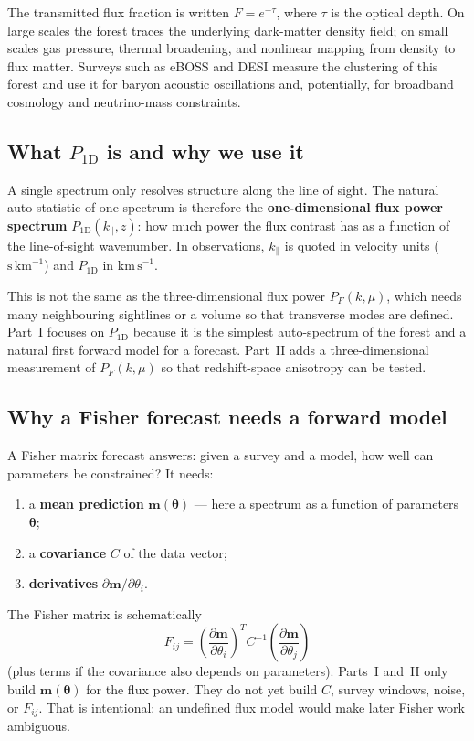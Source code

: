 \documentclass[11pt]{article}
\begin{document}
The transmitted flux fraction is written $F=e^{-\tau}$, where $\tau$ is the optical depth.
On large scales the forest traces the underlying dark-matter density field; on small scales gas pressure, thermal broadening, and nonlinear mapping from density to flux matter.
Surveys such as eBOSS and DESI measure the clustering of this forest and use it for baryon acoustic oscillations and, potentially, for broadband cosmology and neutrino-mass constraints.

\subsection{What $P_{1\mathrm{D}}$ is and why we use it}

A single spectrum only resolves structure along the line of sight.
The natural auto-statistic of one spectrum is therefore the \textbf{one-dimensional flux power spectrum} $P_{1\mathrm{D}}(k_\parallel,z)$: how much power the flux contrast has as a function of the line-of-sight wavenumber.
In observations, $k_\parallel$ is quoted in velocity units ($\mathrm{s\,km}^{-1}$) and $P_{1\mathrm{D}}$ in $\mathrm{km\,s}^{-1}$.

This is not the same as the three-dimensional flux power $P_F(k,\mu)$, which needs many neighbouring sightlines or a volume so that transverse modes are defined.
Part~I focuses on $P_{1\mathrm{D}}$ because it is the simplest auto-spectrum of the forest and a natural first forward model for a forecast.
Part~II adds a three-dimensional measurement of $P_F(k,\mu)$ so that redshift-space anisotropy can be tested.

\subsection{Why a Fisher forecast needs a forward model}

A Fisher matrix forecast answers: given a survey and a model, how well can parameters be constrained?
It needs:
\begin{enumerate}
\item a \textbf{mean prediction} $\mathbf{m}(\boldsymbol{\theta})$ --- here a spectrum as a function of parameters $\boldsymbol{\theta}$;
\item a \textbf{covariance} $C$ of the data vector;
\item \textbf{derivatives} $\partial\mathbf{m}/\partial\theta_i$.
\end{enumerate}
The Fisher matrix is schematically
\begin{equation}
F_{ij}
=
\left(\frac{\partial\mathbf{m}}{\partial\theta_i}\right)^{\!T}
C^{-1}
\left(\frac{\partial\mathbf{m}}{\partial\theta_j}\right)
\end{equation}
(plus terms if the covariance also depends on parameters).
Parts~I and~II only build $\mathbf{m}(\boldsymbol{\theta})$ for the flux power.
They do not yet build $C$, survey windows, noise, or $F_{ij}$.
That is intentional: an undefined flux model would make later Fisher work ambiguous.
\end{document}
